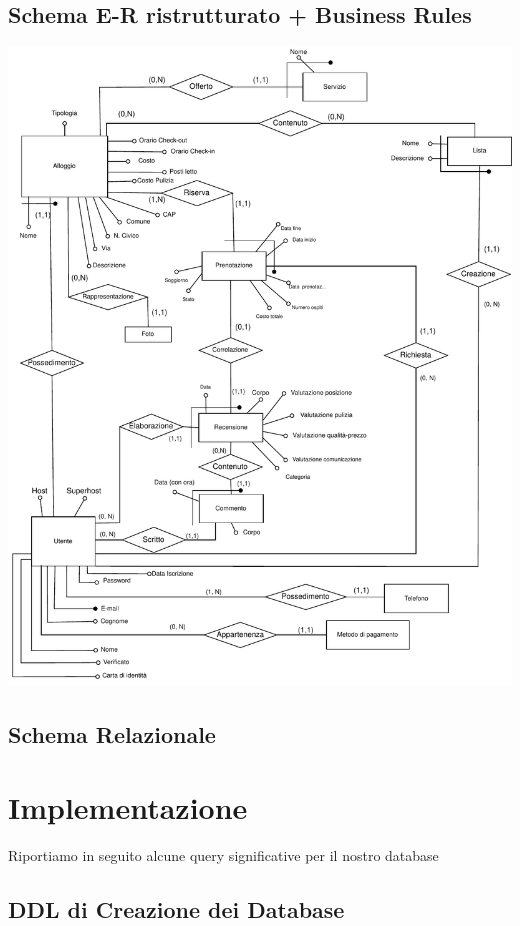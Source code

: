 \documentclass[letterpaper]{report}
\begin{document}
\section{Schema E-R ristrutturato + Business Rules}
\includegraphics[width=\textwidth]{resources/pdf/ER-Ristrutturato.pdf}
\clearpage


\clearpage
\section{Schema Relazionale}


\chapter{Implementazione}

Riportiamo in seguito alcune query significative per il nostro database

\section{DDL di Creazione dei Database}

\end{document}
